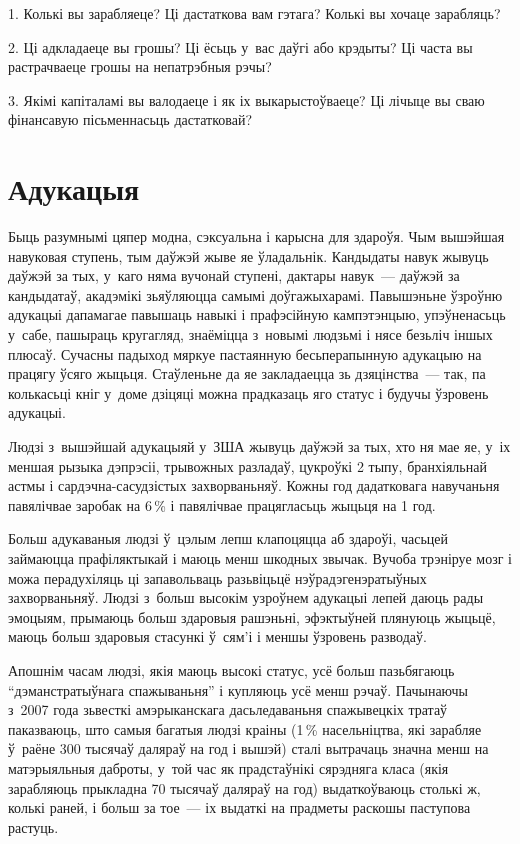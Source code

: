 1. Колькі вы зарабляеце? Ці дастаткова вам гэтага? Колькі вы хочаце зарабляць?

2. Ці адкладаеце вы грошы? Ці ёсьць у~вас даўгі або крэдыты? Ці часта вы растрачваеце грошы на непатрэбныя рэчы?

3. Якімі капіталамі вы валодаеце і як іх выкарыстоўваеце? Ці лічыце вы сваю фінансавую пісьменнасьць дастатковай?


\section{Адукацыя}

Быць разумнымі цяпер модна, сэксуальна і карысна для здароўя. Чым вышэйшая навуковая ступень, тым даўжэй жыве яе ўладальнік. Кандыдаты навук жывуць даўжэй за тых, у~каго няма вучонай ступені, дактары навук~--- даўжэй за кандыдатаў, акадэмікі зьяўляюцца самымі доўгажыхарамі. Павышэньне ўзроўню адукацыі дапамагае павышаць навыкі і прафэсійную кампэтэнцыю, упэўненасьць у~сабе, пашыраць кругагляд, знаёміцца з~новымі людзьмі і нясе безьліч іншых плюсаў. Сучасны падыход мяркуе пастаянную бесьперапынную адукацыю на працягу ўсяго жыцьця. Стаўленьне да яе закладаецца зь дзяцінства~--- так, па колькасьці кніг у~доме дзіцяці можна прадказаць яго статус і будучы ўзровень адукацыі.

Людзі з~вышэйшай адукацыяй у~ЗША жывуць даўжэй за тых, хто ня мае яе, у~іх меншая рызыка дэпрэсіі, трывожных разладаў, цукроўкі 2 тыпу, бранхіяльнай астмы і сардэчна-сасудзістых захворваньняў. Кожны год дадатковага навучаньня павялічвае заробак на 6\,\% і павялічвае працягласьць жыцьця на 1 год.

Больш адукаваныя людзі ў~цэлым лепш клапоцяцца аб здароўі, часьцей займаюцца прафіляктыкай і маюць менш шкодных звычак. Вучоба трэніруе мозг і можа перадухіляць ці запавольваць разьвіцьцё нэўрадэгенэратыўных захворваньняў. Людзі з~больш высокім узроўнем адукацыі лепей даюць рады эмоцыям, прымаюць больш здаровыя рашэньні, эфэктыўней плянуюць жыцьцё, маюць больш здаровыя стасункі ў~сям'і і меншы ўзровень разводаў.

Апошнім часам людзі, якія маюць высокі статус, усё больш пазьбягаюць ``дэманстратыўнага спажываньня'' і купляюць усё менш рэчаў. Пачынаючы з~2007 года зьвесткі амэрыканскага дасьледаваньня спажывецкіх тратаў паказваюць, што самыя багатыя людзі краіны (1\,\% насельніцтва, які зарабляе ў~раёне 300 тысячаў даляраў на год і вышэй) сталі вытрачаць значна менш на матэрыяльныя даброты, у~той час як прадстаўнікі сярэдняга класа (якія зарабляюць прыкладна 70 тысячаў даляраў на год) выдаткоўваюць столькі ж, колькі раней, і больш за тое~--- іх выдаткі на прадметы раскошы паступова растуць.

